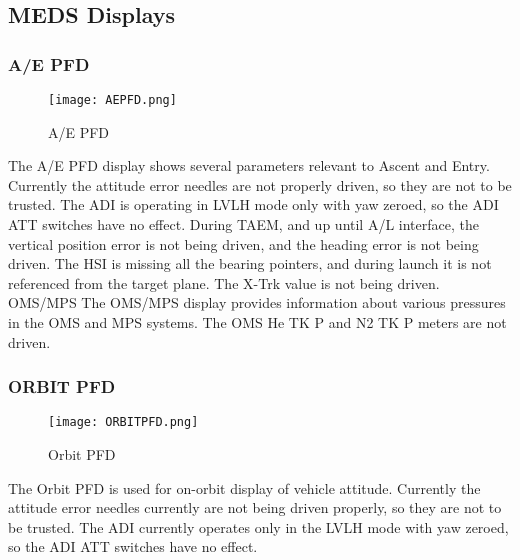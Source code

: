 \documentclass[Space_Shuttle_Ultra_Manual.tex]{subfiles}
\begin{document}
\subsection{MEDS Displays}
\begin{multicols*}{2}
\renewcommand{\cfttoctitlefont}{\bf}
\localtableofcontents
\label{sec:meds-displays}

\subsubsection{A/E PFD}
\begin{figure}[H]
  \texttt{[image: AEPFD.png]}
  \caption{A/E PFD}
  \label{fig:AE_PFD}
\end{figure}
The A/E PFD display shows several parameters relevant to Ascent and Entry. Currently the attitude error needles are not properly driven, so they are not to be trusted. The ADI is operating in LVLH mode only with yaw zeroed, so the ADI ATT switches have no effect. During TAEM, and up until A/L interface, the vertical position error is not being driven, and the heading error is not being driven. The HSI is missing all the bearing pointers, and during launch it is not referenced from the target plane. The X-Trk value is not being driven.
OMS/MPS
The OMS/MPS display provides information about various pressures in the OMS and MPS systems. The OMS He TK P and N2 TK P meters are not driven.

\subsubsection{ORBIT PFD}
\begin{figure}[H]
  \texttt{[image: ORBITPFD.png]}
  \caption{Orbit PFD}
  \label{fig:Orbit_PFD}
\end{figure}
The Orbit PFD is used for on-orbit display of vehicle attitude. Currently the attitude error needles currently are not being driven properly, so they are not to be trusted. The ADI currently operates only in the LVLH mode with yaw zeroed, so the ADI ATT switches have no effect.
\end{multicols*}
\end{document}
